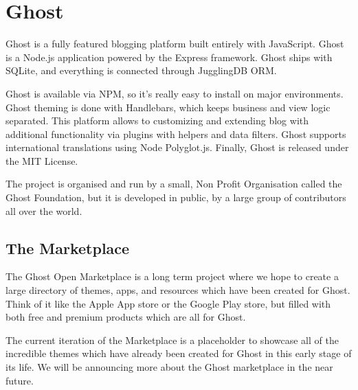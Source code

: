 \section{Ghost}
\label{sec:CMS_ghost}

Ghost is a fully featured blogging platform built entirely with JavaScript.
Ghost is a Node.js application powered by the Express framework. Ghost ships with SQLite, and everything is connected through JugglingDB ORM.

Ghost is available via NPM, so it’s really easy to install on major environments.
Ghost theming is done with Handlebars, which keeps business and view logic separated. 
This platform allows to customizing and extending blog with additional functionality via plugins with helpers and data filters. Ghost supports international translations using Node Polyglot.js.
Finally, Ghost is released under the MIT License. 

The project is organised and run by a small, Non Profit Organisation called the Ghost Foundation, but it is developed in public, by a large group of contributors all over the world.

\subsection{The Marketplace}
\label{subsec:ghost_market}
The Ghost Open Marketplace is a long term project where we hope to create a large directory of themes, apps, and resources which have been created for Ghost. Think of it like the Apple App store or the Google Play store, but filled with both free and premium products which are all for Ghost.

The current iteration of the Marketplace is a placeholder to showcase all of the incredible themes which have already been created for Ghost in this early stage of its life. We will be announcing more about the Ghost marketplace in the near future.